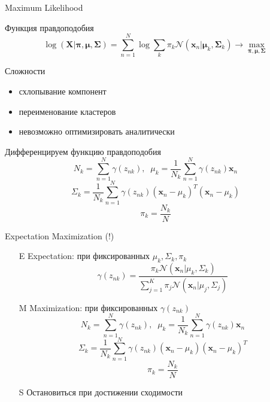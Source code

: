 \documentclass[10pt]{beamer}
\begin{document}
\begin{frame}{Maximum Likelihood}

Функция правдоподобия
\[
\log(\mathbf{X} | \mathbf{\pi}, \mathbf{\mu}, \mathbf{\Sigma}) = \sum_{n=1}^N \log \sum_k \pi_k \mathcal{N}(\mathbf{x}_n | \mathbf{\mu}_k, \mathbf{\Sigma}_k) \rightarrow \max_{\mathbf{\pi}, \mathbf{\mu}, \mathbf{\Sigma}}
\]

Сложности
\begin{itemize}
\item схлопывание компонент
\item переименование кластеров
\item невозможно оптимизировать аналитически
\end{itemize}

\end{frame}

\begin{frame}{}

Дифференцируем функцию правдоподобия
\[
N_k = \sum_{n=1}^N \gamma(z_{nk}), \;\; \mu_k = \frac 1 {N_k} \sum_{n=1}^N \gamma(z_{nk}) \mathbf{x}_n
\]
\[
\Sigma_k = \frac 1 {N_k} \sum_{n=1}^N \gamma(z_{nk}) (\mathbf{x}_n - \mu_k)^T (\mathbf{x}_n - \mu_k)
\]
\[
\pi_k = \frac{N_k}{N}
\]

\end{frame}

\begin{frame}{Expectation Maximization (!)}

\begin{enumerate}
\item[E] Expectation: при фиксированных $\mu_k, \Sigma_k, \pi_k$
\[
\gamma(z_{nk}) = \frac{\pi_k \mathcal{N} (\mathbf{x}_n | \mu_k, \Sigma_k)}{\sum_{j=1}^K \pi_j \mathcal{N} (\mathbf{x}_n | \mu_j, \Sigma_j)}
\]
\item[M] Maximization: при фиксированных $\gamma(z_{nk})$
\[
N_k = \sum_{n=1}^N \gamma(z_{nk}), \;\; \mu_k = \frac 1 {N_k} \sum_{n=1}^N \gamma(z_{nk}) \mathbf{x}_n
\]
\[
\Sigma_k = \frac 1 {N_k} \sum_{n=1}^N \gamma(z_{nk}) (\mathbf{x}_n - \mu_k)(\mathbf{x}_n - \mu_k)^T
\]
\[
\pi_k = \frac{N_k}{N}
\]
\item[S] Остановиться при достижении сходимости
\end{enumerate}

\end{frame}
\end{document}
